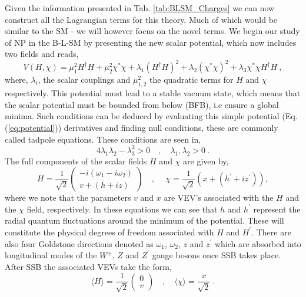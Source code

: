 \documentclass[10pt]{book}
\renewcommand{\(}{\left(}
\renewcommand{\)}{\right)}
\renewcommand{\[}{\left[}
\renewcommand{\]}{\right]}
\begin{document}
Given the information presented in Tab. \ref{tab:BLSM_Charges} we can now construct all the Lagrangian terms for this theory. Much of which would be similar to the SM - we will however focus on the novel terms. We begin our study of NP in the B-L-SM by presenting the new scalar potential, which now includes two fields and reads, 
%
\begin{equation}
\label{eq:potential}
V(H,\chi) = \mu_1^2 H^\dagger H + \mu_2^2 \chi^\ast \chi + \lambda_1 (H^\dagger H)^2 + \lambda_2 \left(\chi^\ast \chi\right)^2 + \lambda_3  \chi^\ast \chi H^\dagger H \ , 
\end{equation}
%
where,  $\lambda_i$, the scalar couplings and $\mu_{1,2}^2$ the quadratic terms for $H$ and $\chi$ respectively. 
%
This potential must lead to a stable vacuum state, which means that the scalar potential must be bounded from below (BFB), i.e ensure a global minima. 
%
Such conditions can be deduced by evaluating this simple potential (Eq.\,(\ref{eq:potential})) derivatives and finding null conditions, these are commonly called tadpole equations. These conditions are seen in,
\begin{equation}
4 \lambda_1 \lambda_2  -  \lambda_3^2 > 0 \quad , \quad \lambda_1 , \lambda_2>0 
\label{eq:BFB} \ .
\end{equation}
%
The full components of the scalar fields $H$ and $\chi$ are given by,
\begin{equation}
H = \frac{1}{\sqrt{2}} 
\begin{pmatrix}
-i \( \omega_1 - i \omega_2 \) \\
v + (h + i z)
\end{pmatrix} \quad , ~\quad \chi = \frac{1}{\sqrt{2}} \( x + \(h^\prime + i z^\prime\) \) , 
\end{equation}
%
where we note that the parameters $v$ and $x$ are VEV’s associated with the $H$ and the $\chi$ field, respectively.
%
In these equations we can see that $h$ and $h^\prime$ represent the radial quantum fluctuations around the minimum of the potential.
%
These will constitute the physical degrees of freedom associated with $H$ and $H^\prime$. There are also four Goldstone directions denoted as $\omega_1$, $\omega_2$, $z$ and $z^\prime$ which are absorbed into longitudinal modes of the $W^\pm$, $Z$ and $Z^\prime$ gauge bosons once SSB takes place. 
%
After SSB the associated VEVs take the form, 
%
\begin{equation}
 \langle H \rangle = \frac{1}{\sqrt{2}} 
\begin{pmatrix}
0 \\
v 
\end{pmatrix} 
\quad , \quad
 \langle  \chi \rangle  = \frac{x}{\sqrt{2}} \ . 
\label{eq:vacuum}
\end{equation}
\end{document}
